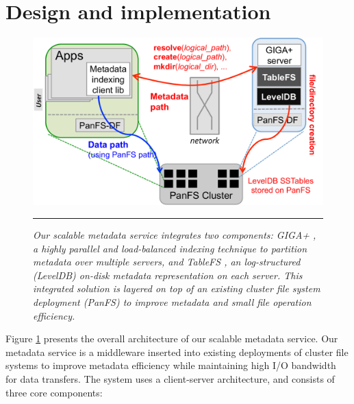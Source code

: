 \section{Design and implementation}

\begin{figure}[!hb]   %
\centerline{\includegraphics[scale=0.35]{./figs/giga-impl-leveldb-clusterfs}}
\vspace{10pt}
\caption{\textit{\footnotesize
Our scalable metadata service integrates two components: GIGA+ \cite{GIGA11},
a highly parallel and load-balanced indexing technique 
to partition metadata over multiple servers, and TableFS \cite{TableFS},
an log-structured (LevelDB) on-disk metadata representation on each server.
This integrated solution is layered on top of an existing cluster
file system deployment (PanFS) to improve metadata
and small file operation efficiency.
}}
\hrule
\label{fig:design}
\end{figure}       %

Figure \ref{fig:design} presents the overall architecture of our scalable
metadata service. Our metadata service is a middleware inserted into
existing deployments of cluster file systems to improve metadata efficiency
while maintaining high I/O bandwidth for data transfers.
The system uses a client-server architecture,
and consists of three core components:

